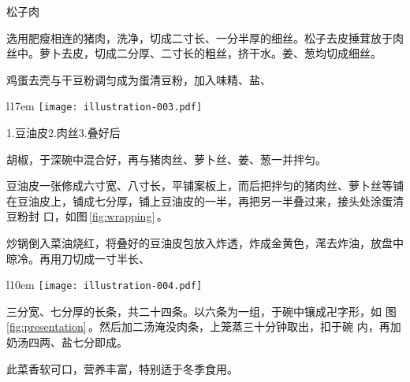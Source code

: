\begin{recipe}{松子肉}

\ingredients


\preparation

\step 选用肥瘦相连的猪肉，洗净，切成二寸长、一分半厚的细丝。松子去皮捶茸放于肉
丝中。萝卜去皮，切成二分厚、二寸长的粗丝，挤干水。姜、葱均切成细丝。

\step 鸡蛋去壳与干豆粉调匀成为蛋清豆粉，加入味精、盐、
\begin{wrapfigure}[7]{l}{17em}%
\centering%
\vspace{-.4375\baselineskip}%
\texttt{[image: illustration-003.pdf]}%
\vspace{-.5625\baselineskip}%
\caption{松子肉包叠法图}%
\label{fig:wrapping}%
{\small 1.豆油皮\hspace{1em}2.肉丝\hspace{1em}3.叠好后}%
\end{wrapfigure}%
胡椒，于深碗中混合好，再与猪肉丝、萝卜丝、姜、葱一并拌匀。

\step 豆油皮一张修成六寸宽、八寸长，平铺案板上，而后把拌匀的猪肉丝、萝卜丝等铺
在豆油皮上，铺成七分厚，铺上豆油皮的一半，再把另一半叠过来，接头处涂蛋清豆粉封
口，如图\,\ref{fig:wrapping}\,。

\step 炒锅倒入菜油烧红，将叠好的豆油皮包放入炸透，炸成金黄色，滗去炸油，放盘中
晾冷。再用刀切成一寸半长、
\begin{wrapfigure}[5]{l}{10em}%
\centering%
\vspace{-1.25\baselineskip}%
\texttt{[image: illustration-004.pdf]}%
\vspace{-.5625\baselineskip}%
\caption{松子肉摆法}%
\label{fig:presentation}%
\end{wrapfigure}%
三分宽、七分厚的长条，共二十四条。以六条为一组，于碗中镶成卍字形，如
图\,\ref{fig:presentation}\,。然后加二汤淹没肉条，上笼蒸三十分钟取出，扣于碗
内，再加奶汤四两、盐七分即成。

\features

此菜香软可口，营养丰富，特别适于冬季食用。

\end{recipe}

